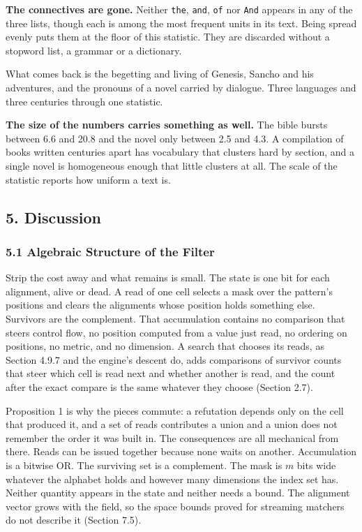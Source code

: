 \noindent\textbf{The connectives are gone.} Neither \texttt{the}, \texttt{and}, \texttt{of} nor \texttt{And} appears in any of the three lists, though each is among the most frequent units in its text. Being spread evenly puts them at the floor of this statistic. They are discarded without a stopword list, a grammar or a dictionary.

What comes back is the begetting and living of Genesis, Sancho and his adventures, and the pronouns of a novel carried by dialogue. Three languages and three centuries through one statistic.

\noindent\textbf{The size of the numbers carries something as well.} The bible bursts between 6.6 and 20.8 and the novel only between 2.5 and 4.3. A compilation of books written centuries apart has vocabulary that clusters hard by section, and a single novel is homogeneous enough that little clusters at all. The scale of the statistic reports how uniform a text is.

\subsection{5. Discussion}

\subsubsection{5.1 Algebraic Structure of the Filter}

Strip the cost away and what remains is small. The state is one bit for each alignment, alive or dead. A read of one cell selects a mask over the pattern's positions and clears the alignments whose position holds something else. Survivors are the complement. That accumulation contains no comparison that steers control flow, no position computed from a value just read, no ordering on positions, no metric, and no dimension. A search that chooses its reads, as Section 4.9.7 and the engine's descent do, adds comparisons of survivor counts that steer which cell is read next and whether another is read, and the count after the exact compare is the same whatever they choose (Section 2.7).

Proposition 1 is why the pieces commute: a refutation depends only on the cell that produced it, and a set of reads contributes a union and a union does not remember the order it was built in. The consequences are all mechanical from there. Reads can be issued together because none waits on another. Accumulation is a bitwise OR. The surviving set is a complement. The mask is \(m\) bits wide whatever the alphabet holds and however many dimensions the index set has. Neither quantity appears in the state and neither needs a bound. The alignment vector grows with the field, so the space bounds proved for streaming matchers do not describe it (Section 7.5).

